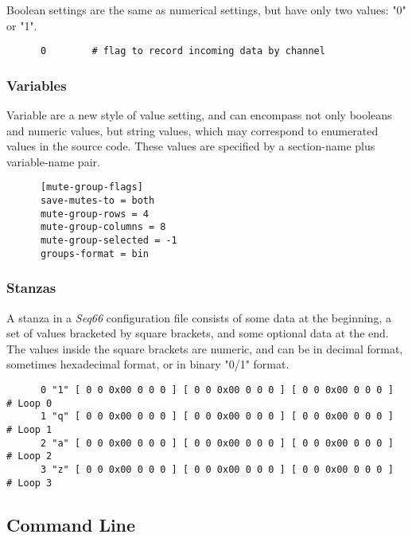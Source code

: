    Boolean settings are the same as numerical settings, but have only
   two values: "0" or "1".

   \begin{verbatim}
      0        # flag to record incoming data by channel
   \end{verbatim}

\subsubsection{Variables}
\label{subsec:configuration_common_variables}

   Variable are a new style of value setting, and can encompass not only booleans
   and numeric values, but string values, which may correspond to enumerated
   values in the source code.  These values are specified by a section-name plus
   variable-name pair.

   \begin{verbatim}
      [mute-group-flags]
      save-mutes-to = both
      mute-group-rows = 4
      mute-group-columns = 8
      mute-group-selected = -1
      groups-format = bin
   \end{verbatim}

\subsubsection{Stanzas}
\label{subsec:configuration_common_stanzas}

   A stanza in a \textsl{Seq66} configuration file consists of some data at the
   beginning, a set of values bracketed by square brackets, and some optional
   data at the end.  The values inside the square brackets are numeric, and can
   be in decimal format, sometimes hexadecimal format, or in binary "0/1" format.

   \begin{verbatim}
      0 "1" [ 0 0 0x00 0 0 0 ] [ 0 0 0x00 0 0 0 ] [ 0 0 0x00 0 0 0 ]  # Loop 0
      1 "q" [ 0 0 0x00 0 0 0 ] [ 0 0 0x00 0 0 0 ] [ 0 0 0x00 0 0 0 ]  # Loop 1
      2 "a" [ 0 0 0x00 0 0 0 ] [ 0 0 0x00 0 0 0 ] [ 0 0 0x00 0 0 0 ]  # Loop 2
      3 "z" [ 0 0 0x00 0 0 0 ] [ 0 0 0x00 0 0 0 ] [ 0 0 0x00 0 0 0 ]  # Loop 3
   \end{verbatim}

\subsection{Command Line}
\label{subsec:configuration_command_line}

